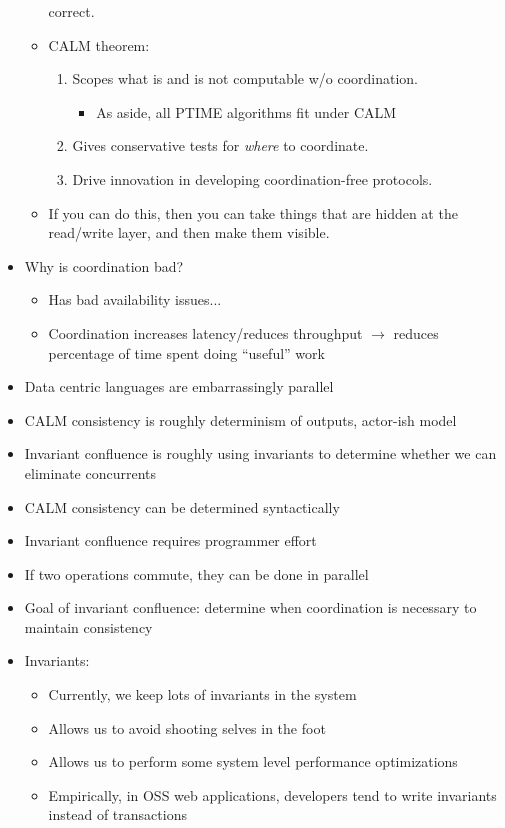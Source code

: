 \documentclass[10pt]{article}
\begin{document}
\begin{itemize}
\begin{itemize}
correct.
\item CALM theorem:
\begin{enumerate}
\item Scopes what is and is not computable w/o coordination. 
\begin{itemize}
\item As aside, all PTIME algorithms fit under CALM
\end{itemize}
\item Gives conservative tests for \emph{where} to coordinate.
\item Drive innovation in developing coordination-free protocols.
\end{enumerate}
\item If you can do this, then you can take things that are hidden at the read/write layer, and then make
them visible.
\end{itemize}
\item Why is coordination bad?
\begin{itemize}
\item Has bad availability issues...
\item Coordination increases latency/reduces throughput $\rightarrow$ reduces percentage of time spent
doing ``useful'' work
\end{itemize}
\item Data centric languages are embarrassingly parallel
\item CALM consistency is roughly determinism of outputs, actor-ish model
\item Invariant confluence is roughly using invariants to determine whether we can eliminate concurrents
\item CALM consistency can be determined syntactically
\item Invariant confluence requires programmer effort
\item If two operations commute, they can be done in parallel
\item Goal of invariant confluence: determine when coordination is necessary to maintain consistency
\item Invariants:
\begin{itemize}
\item Currently, we keep lots of invariants in the system
\item Allows us to avoid shooting selves in the foot
\item Allows us to perform some system level performance optimizations
\item Empirically, in OSS web applications, developers tend to write invariants instead of transactions

\end{itemize}
\end{itemize}
\end{document}
